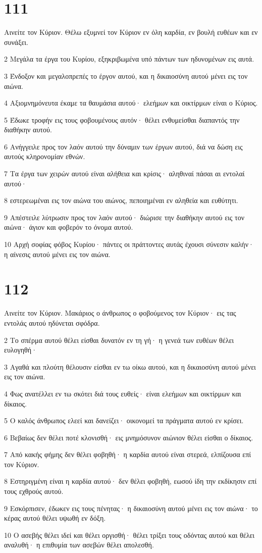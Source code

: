 \chapter{111}

\par Αινείτε τον Κύριον. Θέλω εξυμνεί τον Κύριον εν όλη καρδία, εν βουλή ευθέων και εν συνάξει.
\par 2 Μεγάλα τα έργα του Κυρίου, εξηκριβωμένα υπό πάντων των ηδυνομένων εις αυτά.
\par 3 Ένδοξον και μεγαλοπρεπές το έργον αυτού, και η δικαιοσύνη αυτού μένει εις τον αιώνα.
\par 4 Αξιομνημόνευτα έκαμε τα θαυμάσια αυτού· ελεήμων και οικτίρμων είναι ο Κύριος.
\par 5 Έδωκε τροφήν εις τους φοβουμένους αυτόν· θέλει ενθυμείσθαι διαπαντός την διαθήκην αυτού.
\par 6 Ανήγγειλε προς τον λαόν αυτού την δύναμιν των έργων αυτού, διά να δώση εις αυτούς κληρονομίαν εθνών.
\par 7 Τα έργα των χειρών αυτού είναι αλήθεια και κρίσις· αληθιναί πάσαι αι εντολαί αυτού·
\par 8 εστερεωμέναι εις τον αιώνα του αιώνος, πεποιημέναι εν αληθεία και ευθύτητι.
\par 9 Απέστειλε λύτρωσιν προς τον λαόν αυτού· διώρισε την διαθήκην αυτού εις τον αιώνα· άγιον και φοβερόν το όνομα αυτού.
\par 10 Αρχή σοφίας φόβος Κυρίου· πάντες οι πράττοντες αυτάς έχουσι σύνεσιν καλήν· η αίνεσις αυτού μένει εις τον αιώνα.

\chapter{112}

\par Αινείτε τον Κύριον. Μακάριος ο άνθρωπος ο φοβούμενος τον Κύριον· εις τας εντολάς αυτού ηδύνεται σφόδρα.
\par 2 Το σπέρμα αυτού θέλει είσθαι δυνατόν εν τη γή· η γενεά των ευθέων θέλει ευλογηθή·
\par 3 Αγαθά και πλούτη θέλουσιν είσθαι εν τω οίκω αυτού, και η δικαιοσύνη αυτού μένει εις τον αιώνα.
\par 4 Φως ανατέλλει εν τω σκότει διά τους ευθείς· είναι ελεήμων και οικτίρμων και δίκαιος.
\par 5 Ο καλός άνθρωπος ελεεί και δανείζει· οικονομεί τα πράγματα αυτού εν κρίσει.
\par 6 Βεβαίως δεν θέλει ποτέ κλονισθή· εις μνημόσυνον αιώνιον θέλει είσθαι ο δίκαιος.
\par 7 Από κακής φήμης δεν θέλει φοβηθή· η καρδία αυτού είναι στερεά, ελπίζουσα επί τον Κύριον.
\par 8 Εστηριγμένη είναι η καρδία αυτού· δεν θέλει φοβηθή, εωσού ίδη την εκδίκησιν επί τους εχθρούς αυτού.
\par 9 Εσκόρπισεν, έδωκεν εις τους πένητας· η δικαιοσύνη αυτού μένει εις τον αιώνα· το κέρας αυτού θέλει υψωθή εν δόξη.
\par 10 Ο ασεβής θέλει ιδεί και θέλει οργισθή· θέλει τρίξει τους οδόντας αυτού και θέλει αναλυθή· η επιθυμία των ασεβών θέλει απολεσθή.

